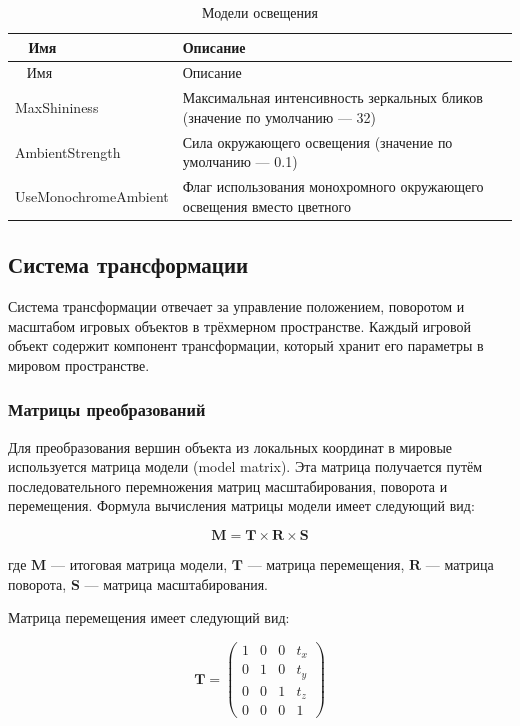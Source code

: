 \begin{xltabular}{\textwidth}{|>{\raggedright\arraybackslash}p{6cm}|>{\raggedright\arraybackslash}X|}
	\caption{Модели освещения\label{tab:global_settings}}\\ \hline
	~ \centrow Имя & \centrow Описание \\ \hline
	\endfirsthead
	~ \centrow Имя & \centrow Описание \\ \hline 
	\finishhead
	MaxShininess & Максимальная интенсивность зеркальных бликов (значение по умолчанию — 32) \\
	\hline
	AmbientStrength & Сила окружающего освещения (значение по умолчанию — 0.1) \\
	\hline
	UseMonochromeAmbient & Флаг использования монохромного окружающего освещения вместо цветного
\end{xltabular}

\subsection{Система трансформации}
Система трансформации отвечает за управление положением, поворотом и масштабом игровых объектов в трёхмерном пространстве. Каждый игровой объект содержит компонент трансформации, который хранит его параметры в мировом пространстве.

\subsubsection{Матрицы преобразований}
Для преобразования вершин объекта из локальных координат в мировые используется матрица модели (model matrix). Эта матрица получается путём последовательного перемножения матриц масштабирования, поворота и перемещения. Формула вычисления матрицы модели имеет следующий вид:

$$
\mathbf{M} = \mathbf{T} \times \mathbf{R} \times \mathbf{S}
$$

где $\mathbf{M}$ — итоговая матрица модели, $\mathbf{T}$ — матрица перемещения, $\mathbf{R}$ — матрица поворота, $\mathbf{S}$ — матрица масштабирования.

Матрица перемещения имеет следующий вид:

$$
\mathbf{T} = \begin{pmatrix}
	1 & 0 & 0 & t_x \\
	0 & 1 & 0 & t_y \\
	0 & 0 & 1 & t_z \\
	0 & 0 & 0 & 1
\end{pmatrix}
$$

